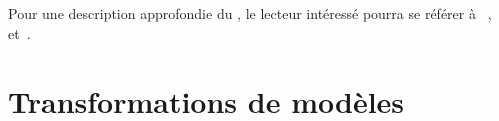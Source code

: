 
Pour une description approfondie du {\mda}, le lecteur intéressé pourra se
référer à ~\cite{Kleppe2003}, \cite{Brown2004} et~\cite{Blanc2005}.


\section{Transformations de modèles}

